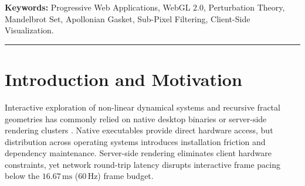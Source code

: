 \documentclass[11pt, a4paper]{article}
\begin{document}
\begin{abstract}
\noindent Browser-based fractal visualization is constrained by IEEE 754 single-precision floating-point limits, host-to-device memory transfer overhead, and spatial aliasing along high-frequency recursive boundaries. This preprint describes a self-contained, zero-dependency monolithic Progressive Web Application (PWA) architecture for real-time fractal rendering in WebGL 2.0, implemented in the public Fractinity application (\url{https://fract.kleynenberg.com/} and \url{https://fractinity.netlify.app/}). By bundling the application shell, offline Service Worker cache, and GLSL ES 3.00 fragment shaders into a single client-side artifact, the system avoids server round-trips and per-frame PCIe framebuffer transfers during interactive navigation. To extend Mandelbrot zoom depth beyond the $10^7$ single-precision saturation threshold, the pipeline computes a high-precision reference orbit and evaluates per-pixel deltas ($\delta_{n+1} = 2z_n\delta_n + \delta_n^2 + \delta_c$) in 32-bit floating-point fragment shaders. In addition, the system implements transcendental Newton--Raphson attraction basins and M\"obius-transformed Apollonian circle packings, combined with a two-pass separable Gaussian filter and velocity-weighted exponential temporal accumulation to reduce sub-pixel aliasing during camera motion. This document is distributed as a self-referential PDF embedding its own \LaTeX\ source under \href{https://creativecommons.org/licenses/by/4.0/}{CC BY 4.0}.
\end{abstract}

\noindent\textbf{Keywords:} Progressive Web Applications, WebGL 2.0, Perturbation Theory, Mandelbrot Set, Apollonian Gasket, Sub-Pixel Filtering, Client-Side Visualization.

\vspace{0.3em}
\noindent\rule{\textwidth}{0.5pt}

\section{Introduction and Motivation}

Interactive exploration of non-linear dynamical systems and recursive fractal geometries has commonly relied on native desktop binaries or server-side rendering clusters \cite{mandelbrot1982fractal, peitgen1986beauty}. Native executables provide direct hardware access, but distribution across operating systems introduces installation friction and dependency maintenance. Server-side rendering eliminates client hardware constraints, yet network round-trip latency disrupts interactive frame pacing below the $16.67\,\text{ms}$ ($60\,\text{Hz}$) frame budget.
\end{document}
